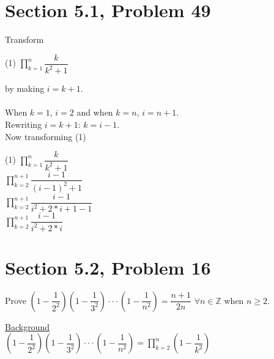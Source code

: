 \documentclass{article}
\author{Nathan Stouffer}
\begin{document}
\section*{Section 5.1, Problem 49}
Transform 
\begin{center}
	(1) $\prod\limits_{k=1}^{n} \dfrac{k}{k^2 + 1}$
\end{center}
by making $i=k+1$. \\\\
When $k=1$, $i=2$ and when $k=n$, $i=n+1$. \\
Rewriting $i=k+1$: $k=i-1$. \\
Now transforming (1)
\begin{center}
	(1) $\prod\limits_{k=1}^{n} \dfrac{k}{k^2 + 1}$ \\
	$\prod\limits_{k=2}^{n+1} \dfrac{i-1}{(i-1)^2 + 1}$ \\
	$\prod\limits_{k=2}^{n+1} \dfrac{i-1}{i^2 + 2*i + 1 - 1}$ \\
	$\prod\limits_{k=2}^{n+1} \dfrac{i-1}{i^2 + 2*i}$
\end{center}

\clearpage
\header

\section*{Section 5.2, Problem 16}
Prove $(1-\dfrac{1}{2^2})(1-\dfrac{1}{3^2})\cdot \cdot \cdot (1-\dfrac{1}{n^2})= \dfrac{n+1}{2n}$ $\forall n \in \mathbb{Z}$ when $n \geq 2$.

\underline{Background} \\
$(1-\dfrac{1}{2^2})(1-\dfrac{1}{3^2})\cdot \cdot \cdot (1-\dfrac{1}{n^2})= \prod\limits_{k=2}^{n}(1-\dfrac{1}{k^2})$
\end{document}

